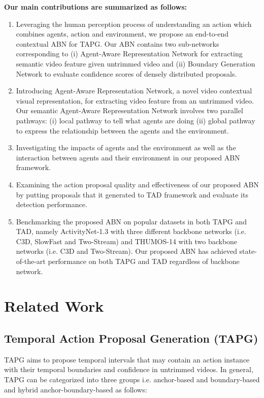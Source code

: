 \documentclass{ieeeaccess}
\begin{document}
\textbf{Our main contributions are summarized as follows:}
\begin{enumerate}
    \item  Leveraging the human perception process of understanding an action which combines agents, action and environment, we propose an end-to-end contextual ABN for TAPG. Our ABN contains two sub-networks corresponding to (i) Agent-Aware Representation Network for extracting semantic video feature given untrimmed video and (ii) Boundary Generation Network to evaluate confidence scores of densely distributed proposals.
    \item Introducing Agent-Aware Representation Network, a novel video contextual visual representation, for extracting video feature from an untrimmed video. Our semantic  Agent-Aware Representation Network involves two parallel pathways: (i) local pathway to tell what agents are doing (ii) global pathway to express the relationship between the agents and the environment.
    \item Investigating the impacts of agents and the environment as well as the interaction between agents and their environment in our proposed ABN framework.
    \item Examining the action proposal quality and effectiveness of our proposed ABN by putting proposals that it generated to TAD framework and evaluate its detection performance.
    \item Benchmarking the proposed ABN on popular datasets in both TAPG and TAD, namely ActivityNet-1.3 with three different backbone networks (i.e. C3D, SlowFast and Two-Stream) and THUMOS-14 with two backbone networks (i.e. C3D and Two-Stream). Our proposed ABN has achieved state-of-the-art performance on both TAPG and TAD regardless of backbone network.
\end{enumerate}

\section{Related Work}

\subsection{Temporal Action Proposal Generation (TAPG)}
TAPG aims to propose temporal intervals that may contain an action instance with their temporal boundaries and confidence in untrimmed videos. In general, TAPG can be categorized into three groups i.e. anchor-based and boundary-based and hybrid anchor-boundary-based as follows:
\end{document}
